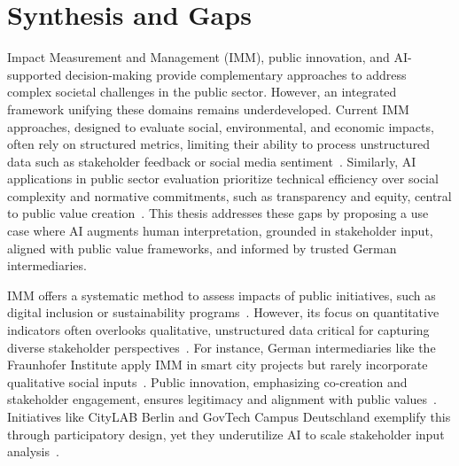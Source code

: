 \section{Synthesis and Gaps}\label{sec:synthesis-and-gaps}

Impact Measurement and Management (IMM), public innovation, and AI-supported decision-making provide complementary approaches to address complex societal challenges in the public sector.
However, an integrated framework unifying these domains remains underdeveloped.
Current IMM approaches, designed to evaluate social, environmental, and economic impacts, often rely on structured metrics, limiting their ability to process unstructured data such as stakeholder feedback or social media sentiment~\cite{epstein_yuthas_2014}.
Similarly, AI applications in public sector evaluation prioritize technical efficiency over social complexity and normative commitments, such as transparency and equity, central to public value creation~\cite{moore_1995,benington_moore_2011}.
This thesis addresses these gaps by proposing a use case where AI augments human interpretation, grounded in stakeholder input, aligned with public value frameworks, and informed by trusted German intermediaries.

IMM offers a systematic method to assess impacts of public initiatives, such as digital inclusion or sustainability programs~\cite{epstein_yuthas_2014}.
However, its focus on quantitative indicators often overlooks qualitative, unstructured data critical for capturing diverse stakeholder perspectives~\cite{fraunhofer_2023}.
For instance, German intermediaries like the Fraunhofer Institute apply IMM in smart city projects but rarely incorporate qualitative social inputs~\cite{fraunhofer_2023}.
Public innovation, emphasizing co-creation and stakeholder engagement, ensures legitimacy and alignment with public values~\cite{moore_1995,benington_moore_2011}.
Initiatives like CityLAB Berlin and GovTech Campus Deutschland exemplify this through participatory design, yet they underutilize AI to scale stakeholder input analysis~\cite{citylab_2024}.

